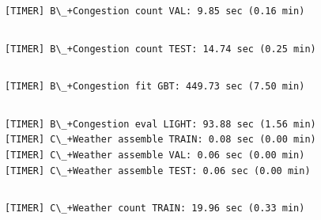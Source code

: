 \documentclass[11pt]{article}
\begin{document}
    \begin{Verbatim}[commandchars=\\\{\}]

    \end{Verbatim}

    \begin{Verbatim}[commandchars=\\\{\}]
[TIMER] B\_+Congestion count VAL: 9.85 sec (0.16 min)
    \end{Verbatim}

    \begin{Verbatim}[commandchars=\\\{\}]

    \end{Verbatim}

    \begin{Verbatim}[commandchars=\\\{\}]
[TIMER] B\_+Congestion count TEST: 14.74 sec (0.25 min)
    \end{Verbatim}

    \begin{Verbatim}[commandchars=\\\{\}]

    \end{Verbatim}

    \begin{Verbatim}[commandchars=\\\{\}]
[TIMER] B\_+Congestion fit GBT: 449.73 sec (7.50 min)
    \end{Verbatim}

    \begin{Verbatim}[commandchars=\\\{\}]

    \end{Verbatim}

    \begin{Verbatim}[commandchars=\\\{\}]
[TIMER] B\_+Congestion eval LIGHT: 93.88 sec (1.56 min)
[TIMER] C\_+Weather assemble TRAIN: 0.08 sec (0.00 min)
[TIMER] C\_+Weather assemble VAL: 0.06 sec (0.00 min)
[TIMER] C\_+Weather assemble TEST: 0.06 sec (0.00 min)
    \end{Verbatim}

    \begin{Verbatim}[commandchars=\\\{\}]

    \end{Verbatim}

    \begin{Verbatim}[commandchars=\\\{\}]
[TIMER] C\_+Weather count TRAIN: 19.96 sec (0.33 min)
    \end{Verbatim}
\end{document}
